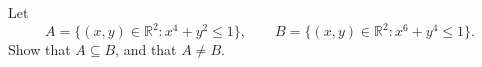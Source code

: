 Let
\[A=\{(x,y)\in\mathbb R^2: x^4+y^2\le1\},\qquad B=\{(x,y)\in\mathbb R^2: x^6+y^4\le1\}.\]
Show that $A\subseteq B$, and that $A\ne B$.
